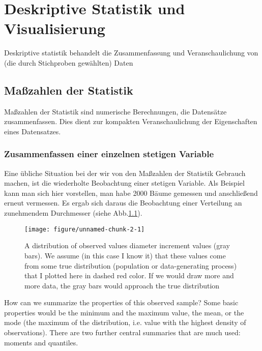 \documentclass[a4paper,twoside]{tufte-book}\usepackage[]{graphicx}\usepackage[]{color}
\makeatletter
\def\maxwidth{ %
	\ifdim\Gin@nat@width>\linewidth
	\linewidth
	\else
	\Gin@nat@width
	\fi
}
\makeatother
\begin{document}
	
	\chapter{Deskriptive Statistik und Visualisierung}
	
	Deskriptive statistik behandelt die Zusammenfassung und Veranschaulichung von (die durch Stichproben gewählten) Daten
	
	\section{Maßzahlen der Statistik}
	
	Maßzahlen der Statistik sind numerische Berechnungen, die Datensätze zusammenfassen. Dies dient zur kompakten Veranschaulichung der Eigenschaften eines Datensatzes.
	
	\subsection{Zusammenfassen einer einzelnen stetigen Variable}
	
	Eine übliche Situation bei der wir von den Maßzahlen der Statistik Gebrauch machen, ist die wiederholte Beobachtung einer stetigen Variable. Als Beispiel kann man sich hier vorstellen, man habe 2000 Bäume gemessen und anschließend erneut vermessen. Es ergab sich daraus die Beobachtung einer Verteilung an zunehmendem Durchmesser (siehe Abb.\ref{fig: data distribution}).

\begin{figure}[htbp]
\begin{center}
\begin{Schunk}

\texttt{[image: figure/unnamed-chunk-2-1]} \end{Schunk}
\caption{A distribution of observed values diameter increment values (gray bars). We assume (in this case I know it) that these values come from some true distribution (population or data-generating process) that I plotted here in dashed red color. If we would draw more and more data, the gray bars would approach the true distribution}
\label{fig: data distribution}
\end{center}
\end{figure}

How can we summarize the properties of this observed sample? Some basic properties would be the minimum and the maximum value, the mean, or the mode (the maximum of the distribution, i.e. value with the highest density of observations). There are two further central summaries that are much used: moments and quantiles.
\end{document}
